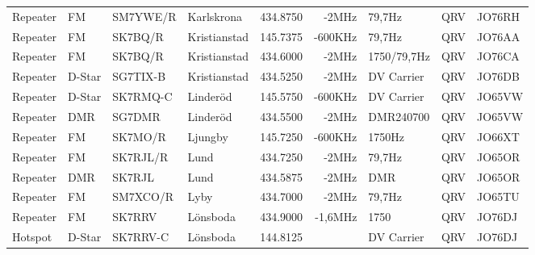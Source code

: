\begin{landscape}
\begin{longtable}{llllrrlcl}
	Repeater                  & FM            & SM7YWE/R      & Karlskrona          & 434.8750          & -2MHz          & 79,7Hz           & QRV             & JO76RH           \\
	Repeater                  & FM            & SK7BQ/R       & Kristianstad        & 145.7375          & -600KHz        & 79,7Hz           & QRV             & JO76AA           \\
	Repeater                  & FM            & SK7BQ/R       & Kristianstad        & 434.6000          & -2MHz          & 1750/79,7Hz      & QRV             & JO76CA           \\
	Repeater                  & D-Star        & SG7TIX-B      & Kristianstad        & 434.5250          & -2MHz          & DV Carrier       & QRV             & JO76DB           \\
	Repeater                  & D-Star        & SK7RMQ-C      & Linderöd            & 145.5750          & -600KHz        & DV Carrier       & QRV             & JO65VW           \\
	Repeater                  & DMR           & SG7DMR        & Linderöd            & 434.5500          & -2MHz          & DMR240700        & QRV             & JO65VW           \\
	Repeater                  & FM            & SK7MO/R       & Ljungby             & 145.7250          & -600KHz        & 1750Hz           & QRV             & JO66XT           \\
	Repeater                  & FM            & SK7RJL/R      & Lund                & 434.7250          & -2MHz          & 79,7Hz           & QRV             & JO65OR           \\
	Repeater                  & DMR           & SK7RJL        & Lund                & 434.5875          & -2MHz          & DMR              & QRV             & JO65OR           \\
	Repeater                  & FM            & SM7XCO/R      & Lyby                & 434.7000          & -2MHz          & 79,7Hz           & QRV             & JO65TU           \\
	Repeater                  & FM            & SK7RRV        & Lönsboda            & 434.9000          & -1,6MHz        & 1750             & QRV             & JO76DJ           \\
	Hotspot                   & D-Star        & SK7RRV-C      & Lönsboda            & 144.8125          &                & DV Carrier       & QRV             & JO76DJ           \\

\end{longtable}
\end{landscape}
